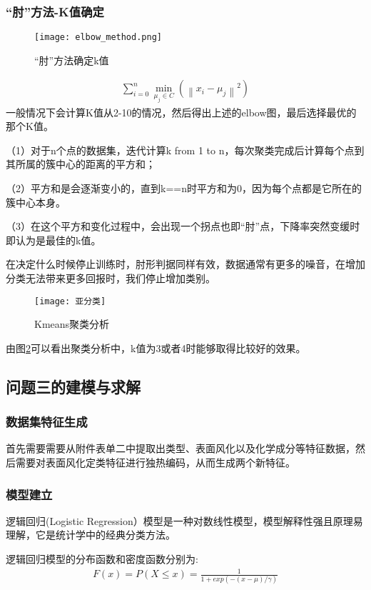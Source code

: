 \subsubsection{``肘''方法-K值确定}
\begin{figure}[!htbp]
	\centering
	\texttt{[image: elbow\_method.png]}
	\setlength{\abovecaptionskip}{3pt}%
	\caption{``肘''方法确定k值}
	\label{p-11}
\end{figure}
\begin{align}
	\sum_{i=0}^n \min _{\mu_j \in C}\left(\left\|x_i-\mu_j\right\|^2\right)
\end{align}
一般情况下会计算K值从2-10的情况，然后得出上述的elbow图，最后选择最优的那个K值。

（1）对于n个点的数据集，迭代计算k from 1 to n，每次聚类完成后计算每个点到其所属的簇中心的距离的平方和；

（2）平方和是会逐渐变小的，直到k==n时平方和为0，因为每个点都是它所在的簇中心本身。

（3）在这个平方和变化过程中，会出现一个拐点也即“肘”点，下降率突然变缓时即认为是最佳的k值。

在决定什么时候停止训练时，肘形判据同样有效，数据通常有更多的噪音，在增加分类无法带来更多回报时，我们停止增加类别。
\begin{figure}[!h]
	\centering
	\texttt{[image: 亚分类]}
	\setlength{\abovecaptionskip}{3pt}%
	\caption{Kmeans聚类分析}
	\label{p-12}
\end{figure}
由图\ref{p-12}可以看出聚类分析中，k值为3或者4时能够取得比较好的效果。

\subsection{问题三的建模与求解}
\subsubsection{数据集特征生成}
首先需要需要从附件表单二中提取出类型、表面风化以及化学成分等特征数据，然后需要对表面风化定类特征进行独热编码，从而生成两个新特征。

\subsubsection{模型建立}
逻辑回归(Logistic Regression）模型是一种对数线性模型，模型解释性强且原理易理解，它是统计学中的经典分类方法。

逻辑回归模型的分布函数和密度函数分别为:
\begin{align}
	F(x)=P(X\le x) = \frac{1}{1+exp(-(x-\mu)/\gamma)}
\end{align}

